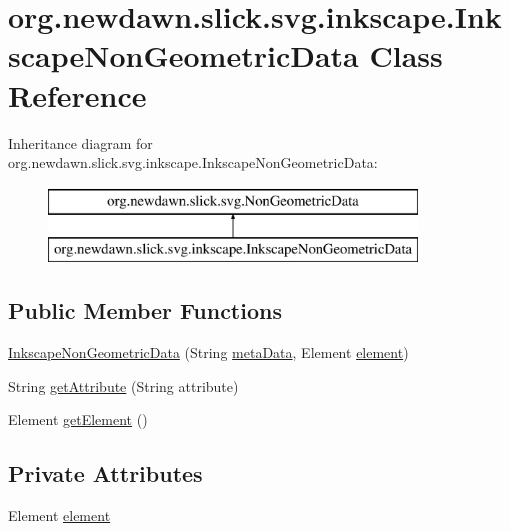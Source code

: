 \hypertarget{classorg_1_1newdawn_1_1slick_1_1svg_1_1inkscape_1_1_inkscape_non_geometric_data}{}\section{org.\+newdawn.\+slick.\+svg.\+inkscape.\+Inkscape\+Non\+Geometric\+Data Class Reference}
\label{classorg_1_1newdawn_1_1slick_1_1svg_1_1inkscape_1_1_inkscape_non_geometric_data}
Inheritance diagram for org.\+newdawn.\+slick.\+svg.\+inkscape.\+Inkscape\+Non\+Geometric\+Data\+:\begin{figure}[H]
\begin{center}
\leavevmode
\includegraphics[height=2.000000cm]{classorg_1_1newdawn_1_1slick_1_1svg_1_1inkscape_1_1_inkscape_non_geometric_data}
\end{center}
\end{figure}
\subsection*{Public Member Functions}
\begin{DoxyCompactItemize}
\item 
\mbox{\hyperlink{classorg_1_1newdawn_1_1slick_1_1svg_1_1inkscape_1_1_inkscape_non_geometric_data_ae23ad1b912f1dd79ec8b3f85b7b72f6d}{Inkscape\+Non\+Geometric\+Data}} (String \mbox{\hyperlink{classorg_1_1newdawn_1_1slick_1_1svg_1_1_non_geometric_data_ab9720408fbd609767acb6528999a3f8d}{meta\+Data}}, Element \mbox{\hyperlink{classorg_1_1newdawn_1_1slick_1_1svg_1_1inkscape_1_1_inkscape_non_geometric_data_a5a9eaa3f1e55ba4c4c37037e1cbd94c1}{element}})
\item 
String \mbox{\hyperlink{classorg_1_1newdawn_1_1slick_1_1svg_1_1inkscape_1_1_inkscape_non_geometric_data_af32f57fe089072927b28408007dfd2eb}{get\+Attribute}} (String attribute)
\item 
Element \mbox{\hyperlink{classorg_1_1newdawn_1_1slick_1_1svg_1_1inkscape_1_1_inkscape_non_geometric_data_a150cb86f501b03af492ca41dfd92952f}{get\+Element}} ()
\end{DoxyCompactItemize}
\subsection*{Private Attributes}
\begin{DoxyCompactItemize}
\item 
Element \mbox{\hyperlink{classorg_1_1newdawn_1_1slick_1_1svg_1_1inkscape_1_1_inkscape_non_geometric_data_a5a9eaa3f1e55ba4c4c37037e1cbd94c1}{element}}
\end{DoxyCompactItemize}
